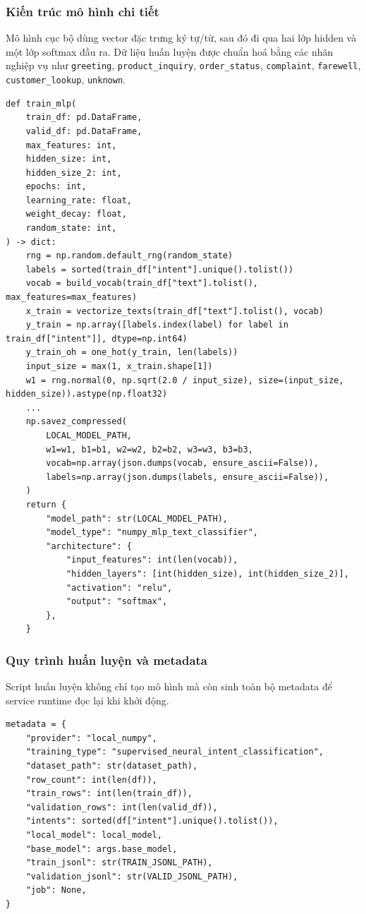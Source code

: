 \documentclass[12pt,a4paper]{article}
\begin{document}
\subsubsection{Kiến trúc mô hình chi tiết}
Mô hình cục bộ dùng vector đặc trưng ký tự/từ, sau đó đi qua hai lớp hidden và một lớp softmax đầu ra. Dữ liệu huấn luyện được chuẩn hoá bằng các nhãn nghiệp vụ như \texttt{greeting}, \texttt{product\_inquiry}, \texttt{order\_status}, \texttt{complaint}, \texttt{farewell}, \texttt{customer\_lookup}, \texttt{unknown}.

\begin{lstlisting}[style=code,caption={Rút gọn phần huấn luyện và lưu mô hình local}]
def train_mlp(
    train_df: pd.DataFrame,
    valid_df: pd.DataFrame,
    max_features: int,
    hidden_size: int,
    hidden_size_2: int,
    epochs: int,
    learning_rate: float,
    weight_decay: float,
    random_state: int,
) -> dict:
    rng = np.random.default_rng(random_state)
    labels = sorted(train_df["intent"].unique().tolist())
    vocab = build_vocab(train_df["text"].tolist(), max_features=max_features)
    x_train = vectorize_texts(train_df["text"].tolist(), vocab)
    y_train = np.array([labels.index(label) for label in train_df["intent"]], dtype=np.int64)
    y_train_oh = one_hot(y_train, len(labels))
    input_size = max(1, x_train.shape[1])
    w1 = rng.normal(0, np.sqrt(2.0 / input_size), size=(input_size, hidden_size)).astype(np.float32)
    ...
    np.savez_compressed(
        LOCAL_MODEL_PATH,
        w1=w1, b1=b1, w2=w2, b2=b2, w3=w3, b3=b3,
        vocab=np.array(json.dumps(vocab, ensure_ascii=False)),
        labels=np.array(json.dumps(labels, ensure_ascii=False)),
    )
    return {
        "model_path": str(LOCAL_MODEL_PATH),
        "model_type": "numpy_mlp_text_classifier",
        "architecture": {
            "input_features": int(len(vocab)),
            "hidden_layers": [int(hidden_size), int(hidden_size_2)],
            "activation": "relu",
            "output": "softmax",
        },
    }
\end{lstlisting}

\subsubsection{Quy trình huấn luyện và metadata}
Script huấn luyện không chỉ tạo mô hình mà còn sinh toàn bộ metadata để service runtime đọc lại khi khởi động.
\begin{lstlisting}[style=code,caption={Sinh metadata và dữ liệu fine-tune}]
metadata = {
    "provider": "local_numpy",
    "training_type": "supervised_neural_intent_classification",
    "dataset_path": str(dataset_path),
    "row_count": int(len(df)),
    "train_rows": int(len(train_df)),
    "validation_rows": int(len(valid_df)),
    "intents": sorted(df["intent"].unique().tolist()),
    "local_model": local_model,
    "base_model": args.base_model,
    "train_jsonl": str(TRAIN_JSONL_PATH),
    "validation_jsonl": str(VALID_JSONL_PATH),
    "job": None,
}
\end{lstlisting}
\end{document}
